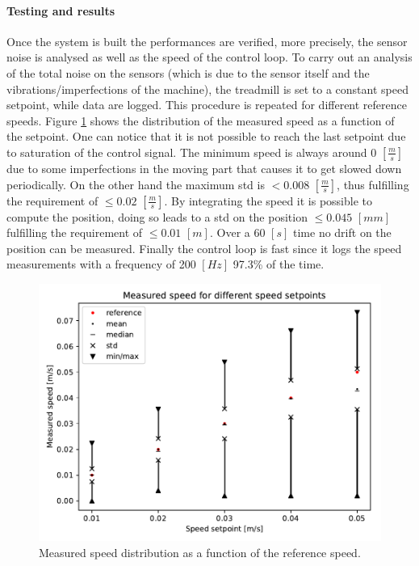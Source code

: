 \documentclass[12pt,a4paper, twoside]{article}
\begin{document}
\begin{multicols}{2}
\paragraph{Testing and results}
Once the system is built the performances are verified, more precisely, the sensor noise is analysed as well as the speed of the control loop. To carry out an analysis of the total noise on the sensors (which is due to the sensor itself and the vibrations/imperfections of the machine), the treadmill is set to a constant speed setpoint, while data are logged. This procedure is repeated for different reference speeds. Figure \ref{fig:steady_state_0} shows the distribution of the measured speed as a function of the setpoint. One can notice that it is not possible to reach the last setpoint due to saturation of the control signal. The minimum speed is always around 0 $[\frac{m}{s}]$ due to some imperfections in the moving part that causes it to get slowed down periodically. On the other hand the maximum std is $<0.008$ $[\frac{m}{s}]$, thus fulfilling the requirement of $\leq0.02$ $[\frac{m}{s}]$. By integrating the speed it is possible to compute the position, doing so leads to a std on the position $\leq 0.045$ $[mm]$ fulfilling the requirement of $\leq0.01$ $[m]$. Over a 60 $[s]$ time no drift on the position can be measured.  Finally the control loop is fast since it logs the speed measurements with a frequency of 200 $[Hz]$ 97.3\% of the time.
\begin{figure}[H]
	\centering
	\includegraphics[width=0.75\linewidth]{fig/steady_state}
	\vspace{-0.1cm}
	\caption{Measured speed distribution as a function of the reference speed.}\label{fig:steady_state_0}
	\vspace{-0.5cm}
\end{figure}

\end{multicols}
\end{document}
